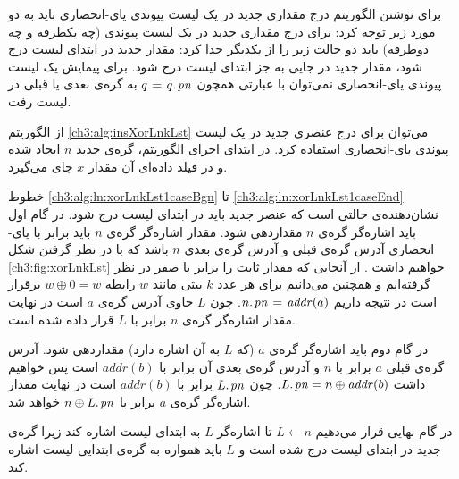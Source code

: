 برای نوشتن الگوریتم درج مقداری جدید در یک لیست پیوندی یای-انحصاری باید به دو مورد زیر توجه کرد:
 برای درج مقداری جدید در یک لیست پیوندی (چه یکطرفه و چه دوطرفه) باید دو حالت زیر را از یکدیگر جدا کرد:
 مقدار جدید در ابتدای لیست درج شود، 
 مقدار جدید در جایی به جز ابتدای لیست درج شود. 
 برای پیمایش یک لیست پیوندی یای-انحصاری نمی‌توان با عبارتی همچون {$q\mathrel{\hspace{1pt}=\hspace{1pt}} q.\hspace*{1pt}\mathit{pn}$} به گره‌ی بعدی یا قبلی در لیست رفت.

از الگوریتم {\eqref{ch3:alg:insXorLnkLst}} می‌توان برای درج عنصری جدید در یک لیست پیوندی یای-انحصاری استفاده کرد. در ابتدای اجرای الگوریتم، گره‌ی جدید {$n$} ایجاد شده و در فیلد داده‌ای آن مقدار {$x$} جای می‌گیرد. 

خطوط {\ref{ch3:alg:ln:xorLnkLst1caseBgn}} تا {\ref{ch3:alg:ln:xorLnkLst1caseEnd}} نشان‌دهنده‌ی حالتی است که عنصر جدید باید در ابتدای لیست درج شود. در گام اول باید اشاره‌گر گره‌ی {$n$} مقداردهی شود. مقدار اشاره‌گر گره‌ی {$n$} باید برابر با یای-انحصاری آدرس گره‌ی قبلی و آدرس گره‌ی بعدی {$n$} باشد که با در نظر گرفتن شکل {\eqref{ch3:fig:xorLnkLst}} خواهیم داشت {}. از آنجایی که مقدار ثابت {} را برابر با صفر در نظر گرفته‌ایم و همچنین می‌دانیم برای هر عدد {$k$} بیتی مانند {$w$} رابطه {$w\oplus 0=w$} برقرار است در نتیجه داریم {$n.\hspace*{1pt}\mathit{pn}\mathrel{\hspace{1pt}=\hspace{1pt}} \mathit{addr}(a)$}. چون {$L$} حاوی آدرس گره‌ی {$a$} است در نهایت مقدار اشاره‌گر گره‌ی {$n$} برابر با {$L$} قرار داده شده است. 

در گام دوم باید اشاره‌گر گره‌ی {$a$} (که {$L$} به آن اشاره دارد) مقداردهی شود. آدرس گره‌ی قبلی {$a$} برابر با {$n$} و آدرس گره‌ی بعدی آن برابر با {$\mathit{addr}(b)$} است پس خواهیم داشت {$L.\hspace*{1pt}\mathit{pn}= n\oplus \mathit{addr}(b)$}. چون {$L.\hspace*{1pt}\mathit{pn}$} برابر با {$\mathit{addr}(b)$} است در نهایت مقدار اشاره‌گر گره‌ی {$a$} برابر با {$n\oplus L.\hspace*{1pt}\mathit{pn}$} خواهد شد.

در گام نهایی قرار می‌دهیم {$L\gets n$} تا اشاره‌گر {$L$} به ابتدای لیست اشاره کند زیرا گره‌ی جدید در ابتدای لیست درج شده است و {$L$} باید همواره به گره‌ی ابتدایی لیست اشاره کند.

